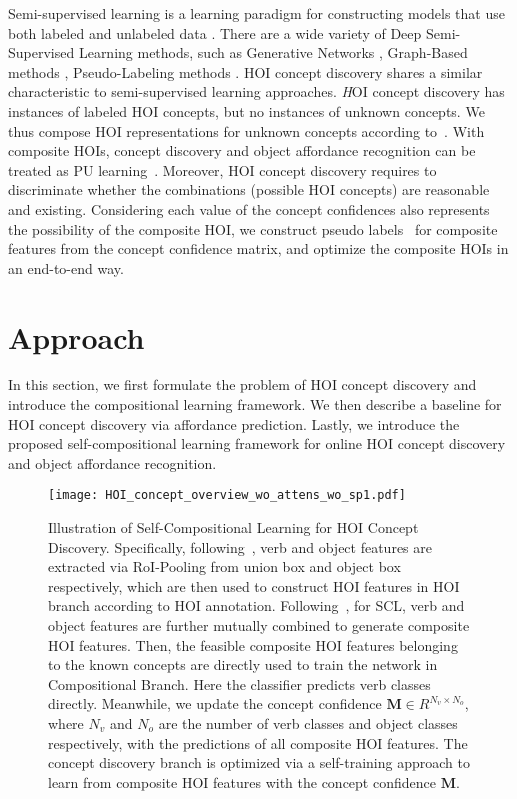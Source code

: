 \documentclass[runningheads]{llncs}
\begin{document}
Semi-supervised learning is a learning paradigm for constructing models that use both labeled and unlabeled data \cite{yang2021survey}. There are a wide variety of Deep Semi-Supervised Learning methods, such as Generative Networks \cite{kingma2014semi,springenberg2015unsupervised}, Graph-Based methods \cite{wang2016structural,gilmer2017neural}, Pseudo-Labeling methods \cite{lee2013pseudo,xie2020self,hinton2015distilling}. HOI concept discovery shares a similar characteristic to semi-supervised learning approaches. {\textit HOI concept discovery has instances of labeled HOI concepts, but no instances of unknown concepts.} We thus compose HOI representations for unknown concepts according to~\cite{scudder1965probability}. With composite HOIs, concept discovery and object affordance recognition can be treated as PU learning~\cite{de1999positive}. Moreover, HOI concept discovery requires to discriminate whether the combinations (possible HOI concepts) are reasonable and existing. Considering each value of the concept confidences also represents the possibility of the composite HOI, we construct pseudo labels~\cite{lee2013pseudo,scudder1965probability} for composite features from the concept confidence matrix, and optimize the composite HOIs in an end-to-end way.




\section{Approach}

In this section, we first formulate the problem of HOI concept discovery and introduce the compositional learning framework. We then describe a baseline for HOI concept discovery via affordance prediction. Lastly, we introduce the proposed self-compositional learning framework for online HOI concept discovery and object affordance recognition.


\begin{figure*}[!ht]
  \centering
  \texttt{[image: HOI\_concept\_overview\_wo\_attens\_wo\_sp1.pdf]}
  \caption{Illustration of Self-Compositional Learning for HOI Concept Discovery. Specifically, following~\cite{hou2020visual}, verb and object features are extracted via RoI-Pooling from union box and object box respectively, which are then used to construct HOI features in HOI branch according to HOI annotation. Following~\cite{hou2020visual}, for SCL, verb and object features are further mutually combined to generate composite HOI features. Then, the feasible composite HOI features belonging to the known concepts are directly used to train the network in Compositional Branch. Here the classifier predicts verb classes directly. Meanwhile, we update the concept confidence $\mathbf{M} \in R^{N_v \times N_o}$, where $N_v$ and $N_o$ are the number of verb classes and object classes respectively, with the predictions of all composite HOI features. The concept discovery branch is optimized via a self-training approach to learn from composite HOI features with the concept confidence $\mathbf{M}$.}
  \label{fig:overview}
\end{figure*}
\end{document}

